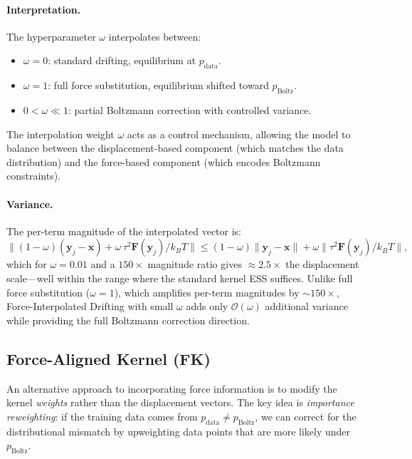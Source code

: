 \documentclass[11pt]{article}
\newcommand{\bx}{\mathbf{x}}
\newcommand{\by}{\mathbf{y}}
\newcommand{\bF}{\mathbf{F}}
\newcommand{\pboltz}{p_{\text{Boltz}}}
\newcommand{\pdata}{p_{\text{data}}}
\newcommand{\kBT}{k_BT}
\begin{document}
\paragraph{Interpretation.}
The hyperparameter $\omega$ interpolates between:
\begin{itemize}
    \item $\omega = 0$: standard drifting, equilibrium at $\pdata$.
    \item $\omega = 1$: full force substitution, equilibrium shifted toward $\pboltz$.
    \item $0 < \omega \ll 1$: partial Boltzmann correction with controlled variance.
\end{itemize}
The interpolation weight $\omega$ acts as a control mechanism, allowing the model to balance between the displacement-based component (which matches the data distribution) and the force-based component (which encodes Boltzmann constraints).

\paragraph{Variance.}
The per-term magnitude of the interpolated vector is:
\begin{equation}
    \|(1-\omega)(\by_j - \bx) + \omega\,\tau^2\bF(\by_j)/\kBT\| \leq (1-\omega)\|\by_j - \bx\| + \omega\|\tau^2\bF(\by_j)/\kBT\|,
\end{equation}
which for $\omega = 0.01$ and a $150\times$ magnitude ratio gives $\approx 2.5\times$ the displacement scale---well within the range where the standard kernel ESS suffices.
Unlike full force substitution ($\omega = 1$), which amplifies per-term magnitudes by ${\sim}150\times$, Force-Interpolated Drifting with small $\omega$ adds only $\mathcal{O}(\omega)$ additional variance while providing the full Boltzmann correction direction.

\subsection{Force-Aligned Kernel (FK)}
\label{sec:force-kernel}

An alternative approach to incorporating force information is to modify the kernel \emph{weights} rather than the displacement vectors.
The key idea is \emph{importance reweighting}: if the training data comes from $\pdata \neq \pboltz$, we can correct for the distributional mismatch by upweighting data points that are more likely under $\pboltz$.
\end{document}
